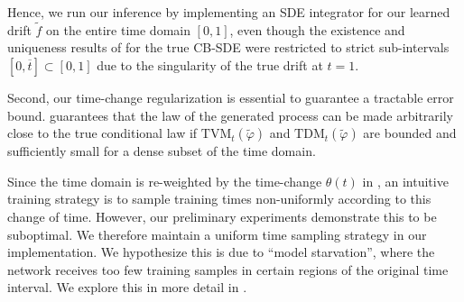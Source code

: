 Hence, we run our inference by implementing an SDE integrator for our learned drift \(\widetilde{f}\) on the entire time domain \([0, 1]\), even though the existence and uniqueness results of  for the true CB-SDE were restricted to strict sub-intervals \([0, \overline{t}] \subset [0, 1]\) due to the singularity of the true drift at \(t = 1\).

Second, our time-change regularization is essential to guarantee a tractable error bound.  guarantees that the law of the generated process can be made arbitrarily close to the true conditional law if \(\mathrm{TVM}_{t}(\widetilde{\varphi})\) and \(\mathrm{TDM}_{t}(\widetilde{\varphi})\) are bounded and sufficiently small for a dense subset of the time domain.

Since the time domain is re-weighted by the time-change \(\theta(t)\) in , an intuitive training strategy is to sample training times non-uniformly according to this change of time. However, our preliminary experiments demonstrate this to be suboptimal.  We therefore maintain a uniform time sampling strategy in our implementation. We hypothesize this is due to ``model starvation'', where the network receives too few training samples in certain regions of the original time interval. We explore this in more detail in .



